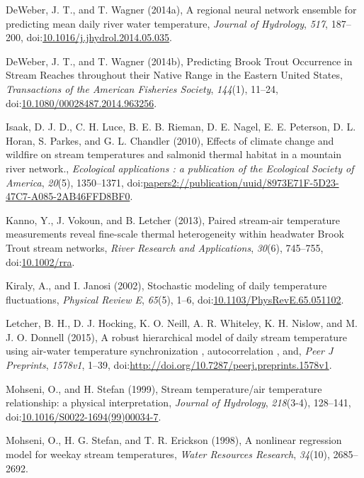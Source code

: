 DeWeber, J. T., and T. Wagner (2014a), A regional neural network
ensemble for predicting mean daily river water temperature,
\emph{Journal of Hydrology}, \emph{517}, 187--200,
doi:\href{http://dx.doi.org/10.1016/j.jhydrol.2014.05.035}{10.1016/j.jhydrol.2014.05.035}.

DeWeber, J. T., and T. Wagner (2014b), Predicting Brook Trout Occurrence
in Stream Reaches throughout their Native Range in the Eastern United
States, \emph{Transactions of the American Fisheries Society},
\emph{144}(1), 11--24,
doi:\href{http://dx.doi.org/10.1080/00028487.2014.963256}{10.1080/00028487.2014.963256}.

Isaak, D. J. D., C. H. Luce, B. E. B. Rieman, D. E. Nagel, E. E.
Peterson, D. L. Horan, S. Parkes, and G. L. Chandler (2010), Effects of
climate change and wildfire on stream temperatures and salmonid thermal
habitat in a mountain river network., \emph{Ecological applications : a
publication of the Ecological Society of America}, \emph{20}(5),
1350--1371,
doi:\href{http://dx.doi.org/papers2://publication/uuid/8973E71F-5D23-47C7-A085-2AB46FFD8BF0}{papers2://publication/uuid/8973E71F-5D23-47C7-A085-2AB46FFD8BF0}.

Kanno, Y., J. Vokoun, and B. Letcher (2013), Paired stream-air
temperature measurements reveal fine-scale thermal heterogeneity within
headwater Brook Trout stream networks, \emph{River Research and
Applications}, \emph{30}(6), 745--755,
doi:\href{http://dx.doi.org/10.1002/rra}{10.1002/rra}.

Kiraly, A., and I. Janosi (2002), Stochastic modeling of daily
temperature fluctuations, \emph{Physical Review E}, \emph{65}(5), 1--6,
doi:\href{http://dx.doi.org/10.1103/PhysRevE.65.051102}{10.1103/PhysRevE.65.051102}.

Letcher, B. H., D. J. Hocking, K. O. Neill, A. R. Whiteley, K. H.
Nislow, and M. J. O. Donnell (2015), A robust hierarchical model of
daily stream temperature using air-water temperature synchronization ,
autocorrelation , and, \emph{Peer J Preprints}, \emph{1578v1}, 1--39,
doi:\href{http://dx.doi.org/http://doi.org/10.7287/peerj.preprints.1578v1}{http://doi.org/10.7287/peerj.preprints.1578v1}.

Mohseni, O., and H. Stefan (1999), Stream temperature/air temperature
relationship: a physical interpretation, \emph{Journal of Hydrology},
\emph{218}(3-4), 128--141,
doi:\href{http://dx.doi.org/10.1016/S0022-1694(99)00034-7}{10.1016/S0022-1694(99)00034-7}.

Mohseni, O., H. G. Stefan, and T. R. Erickson (1998), A nonlinear
regression model for weekay stream temperatures, \emph{Water Resources
Research}, \emph{34}(10), 2685--2692.

